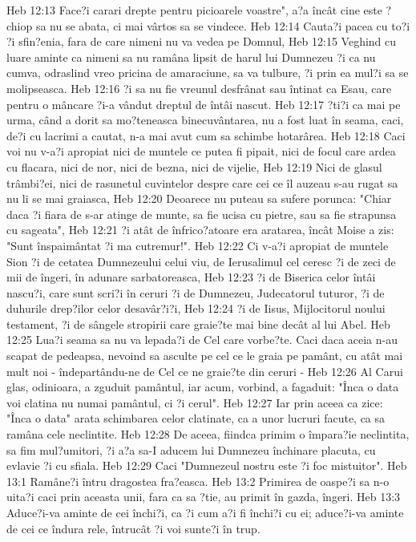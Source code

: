Heb 12:13  Face?i carari drepte pentru picioarele voastre", a?a încât cine este ?chiop sa nu se abata, ci mai vârtos sa se vindece.
Heb 12:14  Cauta?i pacea cu to?i ?i sfin?enia, fara de care nimeni nu va vedea pe Domnul,
Heb 12:15  Veghind cu luare aminte ca nimeni sa nu ramâna lipsit de harul lui Dumnezeu ?i ca nu cumva, odraslind vreo pricina de amaraciune, sa va tulbure, ?i prin ea mul?i sa se molipseasca.
Heb 12:16  ?i sa nu fie vreunul desfrânat sau întinat ca Esau, care pentru o mâncare ?i-a vândut dreptul de întâi nascut.
Heb 12:17  ?ti?i ca mai pe urma, când a dorit sa mo?teneasca binecuvântarea, nu a fost luat în seama, caci, de?i cu lacrimi a cautat, n-a mai avut cum sa schimbe hotarârea.
Heb 12:18  Caci voi nu v-a?i apropiat nici de muntele ce putea fi pipait, nici de focul care ardea cu flacara, nici de nor, nici de bezna, nici de vijelie,
Heb 12:19  Nici de glasul trâmbi?ei, nici de rasunetul cuvintelor despre care cei ce îl auzeau s-au rugat sa nu li se mai graiasca,
Heb 12:20  Deoarece nu puteau sa sufere porunca: "Chiar daca ?i fiara de s-ar atinge de munte, sa fie ucisa cu pietre, sau sa fie strapunsa cu sageata",
Heb 12:21  ?i atât de înfrico?atoare era aratarea, încât Moise a zis: "Sunt înspaimântat ?i ma cutremur!".
Heb 12:22  Ci v-a?i apropiat de muntele Sion ?i de cetatea Dumnezeului celui viu, de Ierusalimul cel ceresc ?i de zeci de mii de îngeri, în adunare sarbatoreasca,
Heb 12:23  ?i de Biserica celor întâi nascu?i, care sunt scri?i în ceruri ?i de Dumnezeu, Judecatorul tuturor, ?i de duhurile drep?ilor celor desavâr?i?i,
Heb 12:24  ?i de Iisus, Mijlocitorul noului testament, ?i de sângele stropirii care graie?te mai bine decât al lui Abel.
Heb 12:25  Lua?i seama sa nu va lepada?i de Cel care vorbe?te. Caci daca aceia n-au scapat de pedeapsa, nevoind sa asculte pe cel ce le graia pe pamânt, cu atât mai mult noi - îndepartându-ne de Cel ce ne graie?te din ceruri -
Heb 12:26  Al Carui glas, odinioara, a zguduit pamântul, iar acum, vorbind, a fagaduit: "Înca o data voi clatina nu numai pamântul, ci ?i cerul".
Heb 12:27  Iar prin aceea ca zice: "Înca o data" arata schimbarea celor clatinate, ca a unor lucruri facute, ca sa ramâna cele neclintite.
Heb 12:28  De aceea, fiindca primim o împara?ie neclintita, sa fim mul?umitori, ?i a?a sa-I aducem lui Dumnezeu închinare placuta, cu evlavie ?i cu sfiala.
Heb 12:29  Caci "Dumnezeul nostru este ?i foc mistuitor".
Heb 13:1  Ramâne?i întru dragostea fra?easca.
Heb 13:2  Primirea de oaspe?i sa n-o uita?i caci prin aceasta unii, fara ca sa ?tie, au primit în gazda, îngeri.
Heb 13:3  Aduce?i-va aminte de cei închi?i, ca ?i cum a?i fi închi?i cu ei; aduce?i-va aminte de cei ce îndura rele, întrucât ?i voi sunte?i în trup.
